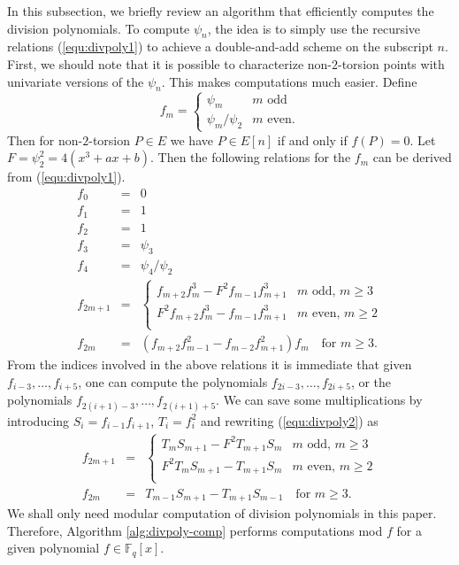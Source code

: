 \documentclass[review]{elsarticle}
\theoremstyle{plain}
\theoremstyle{definition}
\def\F{\ensuremath{\mathbb{F}}}
\begin{document}
In this subsection, we briefly review an algorithm that efficiently computes the division 
polynomials. To compute $\psi_n$, the idea is to simply use the recursive relations 
(\ref{equ:divpoly1}) to achieve a double-and-add scheme on the subscript $n$. First, we should note 
that it is possible to characterize non-$2$-torsion points with univariate versions of the 
$\psi_n$. This makes computations much easier. Define
\[
f_m = 
\begin{cases}
	\psi_m & m \text{ odd} \\
	\psi_m / \psi_2 & m \text{ even}.
\end{cases}
\]
Then for non-$2$-torsion $P \in E$ we have $P \in E[n]$ if and only if $f(P) = 0$. Let $F = 
\psi_2^2 = 4(x^3 + ax + b)$. Then the following relations for the $f_m$ can be derived from 
(\ref{equ:divpoly1}).
\begin{equation}
\label{equ:divpoly2}
	\begin{array}{rll}
		f_0 & = & 0 \\
		f_1 & = & 1 \\
		f_2 & = & 1 \\
		f_3 & = & \psi_3 \\
		f_4 & = & \psi_4 / \psi_2 \\
		f_{2m + 1} & = & 
		\begin{cases}
			f_{m + 2}f_m^3 - F^2f_{m - 1}f_{m + 1}^3 & m \text{ odd, } m \ge 3 \\
			F^2f_{m + 2}f_m^3 - f_{m - 1}f_{m + 1}^3 & m \text{ even, } m \ge 2 \\
		\end{cases} \\
		f_{2m} & = & (f_{m + 2}f_{m - 1}^2 - f_{m - 2}f_{m + 1}^2)f_m \quad \text{for } m \ge 3.
	\end{array}
\end{equation}
From the indices involved in the above relations it is immediate that given $f_{i - 3}, \dots, f_{i 
+ 5}$, one can compute the polynomials $f_{2i - 3}, \dots, f_{2i + 5}$, or the polynomials $f_{2(i 
+ 1) - 3}, \dots, f_{2(i + 1) + 5}$. We can save some multiplications by introducing $S_i = f_{i - 
1}f_{i + 1}$, $T_i = f_i^2$ and rewriting (\ref{equ:divpoly2}) as
\begin{equation}
\label{equ:divpoly3}
\begin{array}{rll}
	f_{2m + 1} & = & 
	\begin{cases}
		T_mS_{m + 1} - F^2T_{m + 1}S_m & m \text{ odd, } m \ge 3 \\
		F^2T_mS_{m + 1} - T_{m + 1}S_m & m \text{ even, } m \ge 2 \\
	\end{cases} \\
	f_{2m} & = & T_{m - 1}S_{m + 1} - T_{m + 1}S_{m - 1} \quad \text{for } m \ge 3.
\end{array}
\end{equation}
We shall only need modular computation of division polynomials in this paper. Therefore, Algorithm 
\ref{alg:divpoly-comp} performs computations mod $f$ for a given polynomial $f \in \F_q[x]$.
\end{document}

